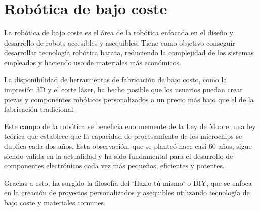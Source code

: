 \newpage
\section{Robótica de bajo coste}
\label{sec:rob_bajo:coste}
La robótica de bajo coste es el área de la robótica enfocada en el diseño y desarrollo de robots 
accesibles y asequibles. Tiene como objetivo conseguir desarrollar tecnología robótica
barata, reduciendo la complejidad de los sistemas empleados y haciendo uso de materiales más económicos.

La disponibilidad de herramientas de fabricación de bajo costo, como la impresión 3D y el corte láser, 
ha hecho posible que los usuarios puedan crear piezas y componentes robóticos personalizados a un 
precio más bajo que el de la fabricación tradicional.

Este campo de la robótica se beneficia enormemente de la Ley de Moore, una ley teórica 
que establece que la capacidad de procesamiento de los microchips se duplica cada dos años. Esta observación, que 
se planteó hace casi 60 años, sigue siendo válida en la actualidad y ha sido fundamental para el desarrollo de componentes 
electrónicos cada vez más pequeños, eficientes y potentes.

Gracias a esto, ha surgido la filosofía del `Hazlo tú mismo` o \ac{DIY}, que se enfoca en la creación de proyectos personalizados y 
asequibles utilizando tecnología de bajo coste y materiales comunes.

